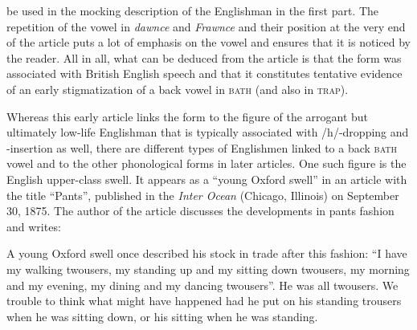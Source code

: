 be used in the mocking description of the Englishman in the first part. The repetition of the vowel in \emph{dawnce} and \emph{Frawnce} and their position at the very end of the article puts a lot of emphasis on the vowel and ensures that it is noticed by the reader. All in all, what can be deduced from the article is that the form was associated with British English speech and that it constitutes tentative evidence of an early stigmatization of a back vowel in \textsc{bath} (and also in \textsc{trap}).


Whereas this early article links the form to the figure of the arrogant but ultimately low-life Englishman that is typically associated with /h/-dropping and -insertion as well, there are different types of Englishmen linked to a back \textsc{bath} vowel and to the other phonological forms in later articles. One such figure is the English upper-class swell. It appears as a “young Oxford swell” in an article with the title “Pants”, published in the \emph{Inter Ocean} (Chicago, Illinois) on September 30, 1875. The author of the article discusses the developments in pants fashion and writes:

\begin{ipquote}
A young Oxford swell once described his stock in trade after this fashion: “I have my walking twousers, my standing up and my sitting down twousers, my morning and my evening, my dining and my dancing twousers”. He was all twousers. We trouble to think what might have happened had he put on his standing trousers when he was sitting down, or his sitting when he was standing.
\end{ipquote}

